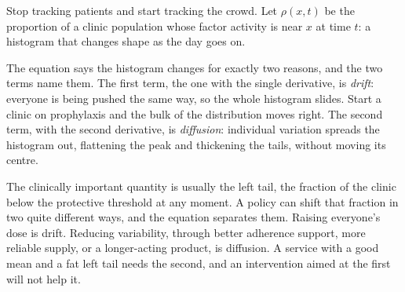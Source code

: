 \begin{reading}
Stop tracking patients and start tracking the crowd. Let $\rho(x,t)$ be the
proportion of a clinic population whose factor activity is near $x$ at time
$t$: a histogram that changes shape as the day goes on.

The equation says the histogram changes for exactly two reasons, and the two
terms name them. The first term, the one with the single derivative, is
\emph{drift}: everyone is being pushed the same way, so the whole histogram
slides. Start a clinic on prophylaxis and the bulk of the distribution moves
right. The second term, with the second derivative, is \emph{diffusion}:
individual variation spreads the histogram out, flattening the peak and
thickening the tails, without moving its centre.

The clinically important quantity is usually the left tail, the fraction of the
clinic below the protective threshold at any moment. A policy can shift that
fraction in two quite different ways, and the equation separates them. Raising
everyone's dose is drift. Reducing variability, through better adherence
support, more reliable supply, or a longer-acting product, is diffusion. A
service with a good mean and a fat left tail needs the second, and an
intervention aimed at the first will not help it.
\end{reading}

